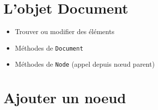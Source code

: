 \hypertarget{lobjet-document}{%
\section{L'objet Document}\label{lobjet-document}}

\begin{itemize}
\tightlist
\item
  Trouver ou modifier des éléments
\item
  Méthodes de \textenglish{\texttt{Document}}
\end{itemize}

\begin{english}

\begin{Shaded}
\begin{Highlighting}[]
    \NormalTok{()}\OperatorTok{,} \NormalTok{()}\OperatorTok{,}
    \NormalTok{()}\OperatorTok{,} \NormalTok{()}\OperatorTok{,} \NormalTok{()}\OperatorTok{,}  
    \NormalTok{()}\OperatorTok{,} \NormalTok{()}
\end{Highlighting}
\end{Shaded}

\end{english}

\begin{itemize}
\tightlist
\item
  Méthodes de \textenglish{\texttt{Node}} (appel depuis nœud parent)
\end{itemize}

\begin{english}

\begin{Shaded}
\begin{Highlighting}[]
    \OperatorTok{,} \OperatorTok{,}
    \OperatorTok{,} \NormalTok{(}\OperatorTok{,}
\end{Highlighting}
\end{Shaded}

\end{english}

\hypertarget{ajouter-un-noeud}{%
\section{Ajouter un noeud}\label{ajouter-un-noeud}}

